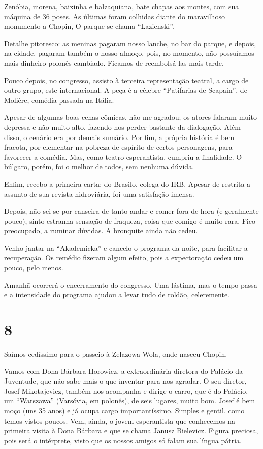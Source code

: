 Zenóbia, morena, baixinha e balzaquiana, bate chapas aos montes, com sua máquina de 36 poses. As últimas foram colhidas diante do maravilhoso monumento a Chopin, O parque se chama ``Lazienski''.

Detalhe pitoresco: as meninas pagaram nosso lanche, no bar do parque, e depois, na cidade, pagaram também o nosso almoço, pois, no momento, não possuíamos mais dinheiro polonês cambiado. Ficamos de reembolsá-las mais tarde.

Pouco depois, no congresso, assisto à terceira representação teatral, a cargo de outro grupo, este internacional. A peça é a célebre ``Patifarias de Scapain'', de Molière, comédia passada na Itália.

Apesar de algumas boas cenas cômicas, não me agradou; os atores falaram muito depressa e não muito alto, fazendo-nos perder bastante da dialogação. Além disso, o cenário era por demais sumário. Por fim, a própria história é bem fracota, por elementar na pobreza de espírito de certos personagens, para favorecer a comédia. Mas, como teatro esperantista, cumpriu a finalidade. O búlgaro, porém, foi o melhor de todos, sem nenhuma dúvida.

Enfim, recebo a primeira carta: do Brasilo, colega do IRB. Apesar de restrita a assunto de sua revista hidroviária, foi uma satisfação imensa.

Depois, não sei se por canseira de tanto andar e comer fora de hora (e geralmente pouco), sinto estranha sensação de fraqueza, coisa que comigo é muito rara. Fico preocupado, a ruminar dúvidas. A bronquite ainda não cedeu.

Venho jantar na ``Akademicka'' e cancelo o programa da noite, para facilitar a recuperação. Os remédio fizeram algum efeito, pois a expectoração cedeu um pouco, pelo menos.

Amanhã ocorrerá o encerramento do congresso. Uma lástima, mas o tempo passa e a intensidade do programa ajudou a levar tudo de roldão, celeremente.

\section*{8 \adfflatleafright {}}
Saímos cedíssimo para o passeio à Zelazowa Wola, onde nasceu Chopin.

Vamos com Dona Bárbara Horowicz, a extraordinária diretora do Palácio da Juventude, que não sabe mais o que inventar para nos agradar. O seu diretor, Josef Mikotajevicz, também nos acompanha e dirige o carro, que é do Palácio, um ``Warszawa'' (Varsóvia, em polonês), de seis lugares, muito bom. Josef é bem moço (uns 35 anos) e já ocupa cargo importantíssimo. Simples e gentil, como temos vistos poucos. Vem, ainda, o jovem esperantista que conhecemos na primeira visita à Dona Bárbara e que se chama Janusz Bielevicz. Figura preciosa, pois será o intérprete, visto que os nossos amigos só falam sua língua pátria.

